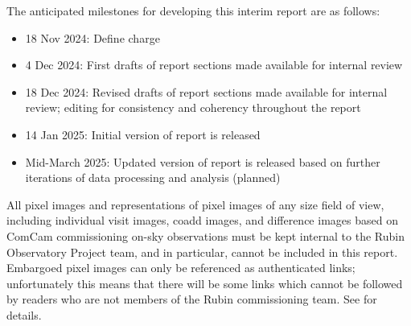 The anticipated milestones for developing this interim report are as follows:

\begin{itemize}

    \item 18 Nov 2024: Define charge

    \item 4 Dec 2024: First drafts of report sections made available for internal review

    \item 18 Dec 2024: Revised drafts of report sections made available for internal review; editing for consistency and coherency throughout the report

    \item 14 Jan 2025: Initial version of report is released

    \item Mid-March 2025: Updated version of report is released based on further iterations of data processing and analysis (planned)

\end{itemize}

\begin{warning}
    All pixel images and representations of pixel images of any size field of view, including individual visit images, coadd images, and difference images based on ComCam commissioning on-sky observations must be kept internal to the Rubin Observatory Project team, and in particular, cannot be included in this report.
    Embargoed pixel images can only be referenced as authenticated links; unfortunately this means that
    there will be some links which cannot be followed by readers who are not members of the
    Rubin commissioning team.
    See  for details.
\end{warning}

